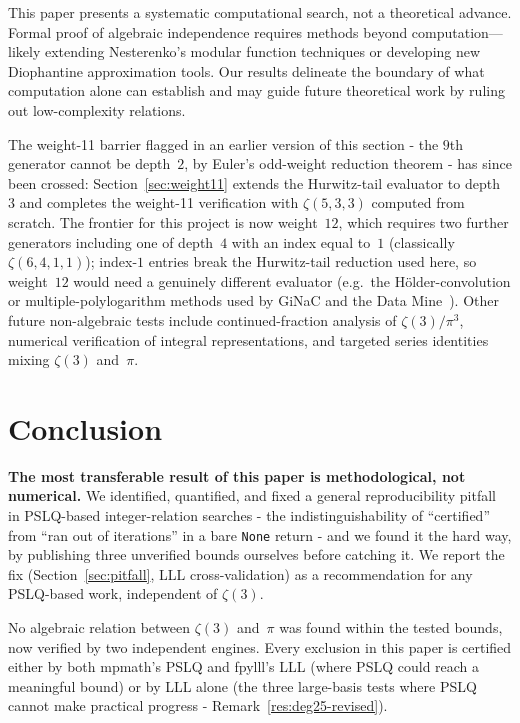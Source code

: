 \documentclass[12pt]{article}
\theoremstyle{definition}
\theoremstyle{remark}
\begin{document}
This paper presents a systematic computational search, not a
theoretical advance.  Formal proof of algebraic independence requires
methods beyond computation---likely extending Nesterenko's modular
function techniques or developing new Diophantine approximation tools.
Our results delineate the boundary of what computation alone can
establish and may guide future theoretical work by ruling out
low-complexity relations.

The weight-11 barrier flagged in an earlier version of this
section - the $9$th generator cannot be depth~$2$, by Euler's
odd-weight reduction theorem - has since been crossed:
Section~\ref{sec:weight11} extends the Hurwitz-tail evaluator to
depth~$3$ and completes the weight-11 verification with
$\zeta(5,3,3)$ computed from scratch.  The frontier for this project
is now weight~$12$, which requires two further generators including
one of depth~$4$ with an index equal to~$1$ (classically
$\zeta(6,4,1,1)$); index-$1$ entries break the Hurwitz-tail
reduction used here, so weight~$12$ would need a genuinely different
evaluator (e.g.\ the H\"older-convolution or multiple-polylogarithm
methods used by GiNaC and the Data Mine~\cite{BBV2010}).  Other future non-algebraic tests include
continued-fraction analysis of $\zeta(3)/\pi^3$, numerical
verification of integral representations, and targeted series
identities mixing $\zeta(3)$ and~$\pi$.


\section{Conclusion}\label{sec:conclusion}

\textbf{The most transferable result of this paper is methodological,
not numerical.}  We identified, quantified, and fixed a general
reproducibility pitfall in PSLQ-based integer-relation searches - the
indistinguishability of ``certified'' from ``ran out of iterations''
in a bare \texttt{None} return - and we found it the hard way, by
publishing three unverified bounds ourselves before catching it.  We
report the fix (Section~\ref{sec:pitfall}, LLL cross-validation) as a
recommendation for any PSLQ-based work, independent of $\zeta(3)$.

No algebraic relation between $\zeta(3)$ and~$\pi$ was found within
the tested bounds, now verified by two independent engines.  Every
exclusion in this paper is certified either by both mpmath's PSLQ and
fpylll's LLL (where PSLQ could reach a meaningful bound) or by LLL
alone (the three large-basis tests where PSLQ cannot make practical
progress - Remark~\ref{res:deg25-revised}).
\end{document}
